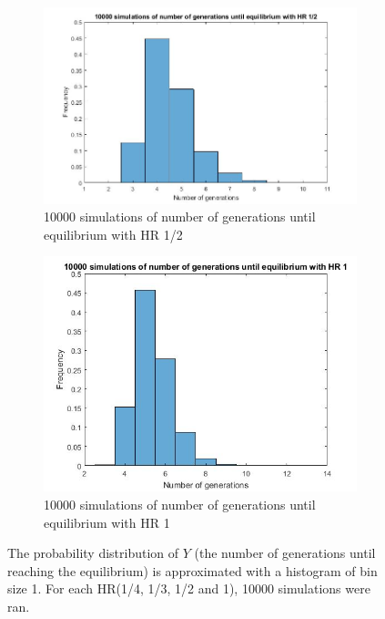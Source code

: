 \begin{figure}[H]
\begin{subfigure}{0.4\textwidth}
    \end{subfigure}
    ~ %
    \begin{subfigure}{0.4\textwidth}
        \includegraphics[width=\textwidth]{GenormHistogramAantalgen2}
        \caption{10000 simulations of number of generations until equilibrium with HR 1/2}
        \label{minimal happiness 1}
    \end{subfigure}
    \begin{subfigure}{0.4\textwidth}
        \includegraphics[width=\textwidth]{GenormHistogramAantalgen1}
        \caption{10000 simulations of number of generations until equilibrium with HR 1}
        \label{minimal happiness 2}
    \end{subfigure}
    \caption{The probability distribution of $Y$ (the number of generations until reaching the equilibrium) is approximated with a histogram of bin size 1. For each HR(1/4, 1/3, 1/2 and 1), 10000 simulations were ran.}\label{fig:histogram}
\end{figure}

